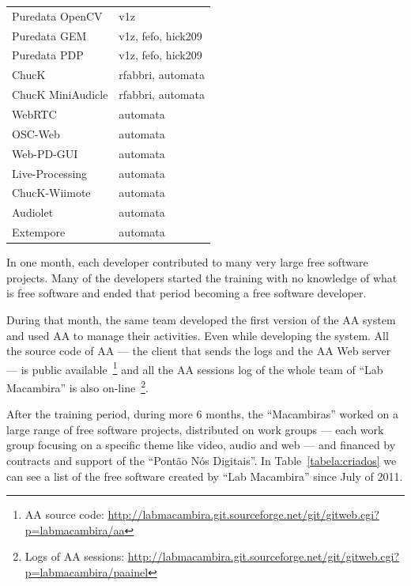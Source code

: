 \documentclass[letterpaper]{article}
\begin{document}
\begin{table}
\begin{tabular}{|l|l|}
        Puredata OpenCV       & v1z                                 \\
        Puredata GEM          & v1z, fefo, hick209                  \\
        Puredata PDP          & v1z, fefo, hick209                  \\
        ChucK                 & rfabbri, automata                   \\
        ChucK MiniAudicle     & rfabbri, automata                   \\
        WebRTC                & automata                            \\
        OSC-Web               & automata                            \\
        Web-PD-GUI            & automata                            \\
        Live-Processing       & automata                            \\
        ChucK-Wiimote         & automata                            \\
        Audiolet              & automata                            \\
        Extempore             & automata                            \\
        \hline
    \end{tabular}
    \label{tabela:contribuicoes}
\end{table}

In one month, each developer contributed to many very large free software
projects. Many of the developers started the training with no
knowledge of what is free software and ended that period becoming a
free software developer.

During that month, the same team developed the first version of the AA
system and used AA to manage their activities. Even while developing
the system. All the source code of AA --- the client that sends the
logs and the AA Web server --- is public available~\footnote{AA source
  code:
  \url{http://labmacambira.git.sourceforge.net/git/gitweb.cgi?p=labmacambira/aa}}
and all the AA sessions log of the whole team of ``Lab Macambira'' is
also on-line~\footnote{Logs of AA sessions:
  \url{http://labmacambira.git.sourceforge.net/git/gitweb.cgi?p=labmacambira/paainel}}.

After the training period, during more 6 months, the ``Macambiras''
worked on a large range of free software projects, distributed on work
groups --- each work group focusing on a specific theme like video,
audio and web --- and financed by contracts and support of the
``Pont\~{a}o N\'{o}s Digitais''. In Table~\ref{tabela:criados} we can
see a list of the free software created by ``Lab Macambira'' since
July of 2011.
\end{document}
